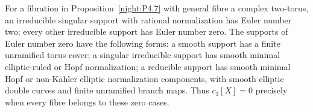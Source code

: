 \begin{proposition}\hypertarget{tag-02Y0}{}\label{night:P4.8}\label{stmt:P4.8}

For a fibration in Proposition~\ref{night:P4.7} with general fibre
a complex two-torus, an irreducible singular support with
rational normalization has Euler number two; every other irreducible
support has Euler number zero. The supports of Euler number zero have the following forms: a smooth support has a finite unramified
torus cover; a singular irreducible support has smooth minimal
elliptic-ruled or Hopf normalization; a reducible support has smooth
minimal Hopf or non-Kähler elliptic normalization components, with
smooth elliptic double curves and finite unramified branch maps.
Thus $c_3[X]=0$ precisely when every fibre belongs to these zero cases.
\end{proposition}
